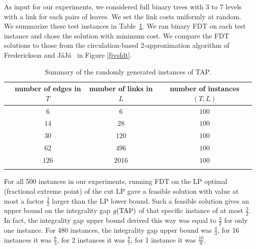 As input for our experiments, we considered full binary trees with 3 to 7 levels with a link for each pairs of leaves. We set the link costs uniformly at random.  We summarize these test instances in Table~\ref{tableTAP}. We ran binary FDT on each test instance and chose the solution with minimum cost. We compare the FDT solutions to those from the circulation-based 2-approximation algorithm of Frederickson and J\'{a}J\'{a}~\cite{FJ81} in Figure \ref{fjvsfdt}.  


\begin{table}[h!]
	\begin{small}
		\centering
		\begin{tabular}{c c c c}
			\hline
			& number of edges in $T$ & number of links in $L$ & number of instances $(T,L)$\\ \hline
			 & $6$ & $6$ & $100$ \\ 
			 & $14$ & $28$ & $100$ \\ 
			 & $30$ & $120$ & $100$ \\
			 & $62$ & $496$ & $100$ \\ 
			  & $126$ & $2016$ & $100$ \\  \hline \\
		\end{tabular}\caption{Summary of the randomly generated instances of TAP.} \label{tableTAP}
	\end{small}
\end{table}
For all 500 instances in our experiments, running FDT on the LP optimal (fractional extreme point) of the cut LP gave a feasible solution with value at most a factor $\frac{3}{2}$ larger than the LP lower bound.  Such a feasible solution gives an upper bound on the integrality gap $g(\operatorname{{{TAP}}})$ of that specific instance of at most $\frac{3}{2}$.
In fact, the integrality gap upper bound derived this way was equal to $\frac{3}{2}$ for only one instance.
For 480 instances, the integrality gap upper bound was $\frac{4}{3}$, for 16 instances it was $\frac{6}{5}$, for 2 instances it was $\frac{8}{7}$, for 1 instance it was $\frac{10}{9}$. 
